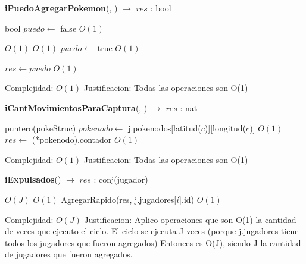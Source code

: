 \begin{Algoritmos}
\begin{algorithmic}[1]
\end{algorithmic}




\begin{algorithm}[H]
{\textbf{iPuedoAgregarPokemon}(, ) $\to$ $res$ : bool}
\begin{algorithmic}[1]

\State bool $puedo \gets$ false  \Comment $O(1)$

   \Comment $O(1)$
       \Comment $O(1)$
        \State $puedo \gets$ true        \Comment $O(1)$
    \EndIf
\EndIf

\State $res \gets puedo$  \Comment $O(1)$

\medskip
\State \underline{Complejidad:} $O(1)$
\State \underline{Justificacion:} Todas las operaciones son O(1)

\end{algorithmic}
\end{algorithm}



\begin{algorithm}[H]
{\textbf{iCantMovimientosParaCaptura}(, ) $\to$ $res$ :    nat}
\begin{algorithmic}[1]

\State puntero(pokeStruc) $pokenodo \gets$ j.pokenodos[latitud($c$)][longitud($c$)] \Comment $O(1)$
\State $res \gets$ (*pokenodo).contador  \Comment $O(1)$

\medskip
\State \underline{Complejidad:} $O(1)$
\State \underline{Justificacion:} Todas las operaciones son O(1)

\end{algorithmic}
\end{algorithm}



\begin{algorithm}[H]
{\textbf{iExpulsados}() $\to$ $res$ : conj(jugador)}
\begin{algorithmic}[1]

   \Comment $O(J)$
       \Comment $O(1)$
        AgregarRapido(res, j.jugadores[$i$].id)  \Comment $O(1)$        
    \EndIf
\EndFor

\medskip
\State \underline{Complejidad:} $O(J)$
\State \underline{Justificacion:} Aplico operaciones que son O(1) la cantidad de veces que ejecuto el ciclo. El ciclo se ejecuta J veces (porque j.jugadores tiene todos los jugadores que fueron agregados) Entonces es O(J), siendo J la cantidad de jugadores que fueron agregados.


\end{algorithmic}
\end{algorithm}
\end{Algoritmos}
